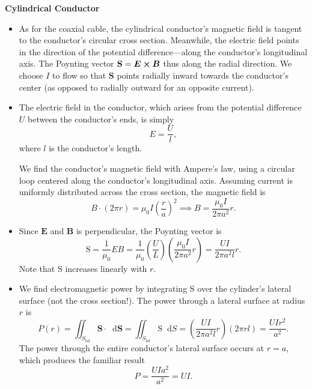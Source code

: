 \documentclass[11pt, a4paper]{article}
\newcommand{\diff}{\mathop{}\!\mathrm{d}} %
\renewcommand{\vec}[1]{\bm{#1}} %
\newcommand{\E}{\vec{E}}  %
\newcommand{\B}{\vec{B}}  %
\renewcommand{\S}{\mathbf{S}}  %
\renewcommand{\SS}{\mathrm{S}}  %
\newcommand{\mm}{\mu_{0}}  %
\newcommand{\m}{\vec{m}}  %
\newcommand{\Poy}{Poynting\xspace}
\begin{document}
\textbf{Cylindrical Conductor}
\begin{itemize}
	\item As for the coaxial cable, the cylindrical conductor's magnetic field is tangent to the conductor's circular cross section. Meanwhile, the electric field points in the direction of the potential difference---along the conductor's longitudinal axis. The \Poy vector $ \S = \E \cross \B $ thus along the radial direction. We choose $ I $ to flow so that $ \S $ points radially inward towards the conductor's center (as opposed to radially outward for an opposite current).
	
	\item The electric field in the conductor, which arises from the potential difference $ U $ between the conductor's ends, is simply
	\begin{equation*}
		E = \frac{U}{l},
	\end{equation*}
	where $ l $ is the conductor's length.
	
	We find the conductor's magnetic field with Ampere's law, using a circular loop centered along the conductor's longitudinal axis. Assuming current is uniformly distributed across the cross section, the magnetic field is
	\begin{equation*}
		B \cdot (2\pi r) = \mm I \left(\frac{r}{a}\right)^{2} \implies B =  \frac{\mm I}{2\pi a^{2}}r.
	\end{equation*}
	
	\item Since $ \E $ and $ \B $ is perpendicular, the \Poy vector is
	\begin{equation*}
		\SS = \frac{1}{\mm}E B = \frac{1}{\mm} \left(\frac{U}{L}\right)\left( \frac{\mm I}{2\pi a^{2}}r\right) = \frac{UI}{2\pi a^{2}l}r.
	\end{equation*}
	Note that $ \SS $ increases linearly with $ r $. 
	
	\item We find electromagnetic power by integrating $ \SS $ over the cylinder's lateral surface (not the cross section!). The power through a lateral surface at radius $ r $ is
	\begin{equation*}
		P(r) = \iint_{S_{\text{lat}}} \S \cdot \diff \vec{S} = \iint_{S_{\text{lat}}} \SS \diff S =  \left(\frac{UI}{2\pi a^{2}l}r\right) (2\pi r l) = \frac{UIr^{2}}{a^{2}}.
	\end{equation*}
	The power through the entire conductor's lateral surface occurs at $ r = a $, which produces the familiar result
	\begin{equation*}
		P = \frac{UIa^{2}}{a^{2}} = UI.
	\end{equation*}
	

\end{itemize}
\end{document}

